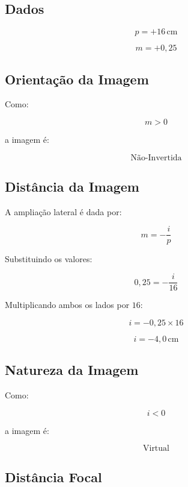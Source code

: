 \documentclass[12pt,a4paper]{article}
\begin{document}

\subsection*{Dados}

\[
p = +16\,\text{cm}
\]

\[
m = +0,25
\]


\subsection*{Orientação da Imagem}

Como:

\[
m > 0
\]

a imagem é:

\[
\boxed{\text{Não-Invertida}}
\]


\subsection*{Distância da Imagem}

A ampliação lateral é dada por:

\[
m = -\frac{i}{p}
\]

Substituindo os valores:

\[
0,25 = -\frac{i}{16}
\]

Multiplicando ambos os lados por $16$:

\[
i = -0,25 \times 16
\]

\[
i = -4,0\,\text{cm}
\]


\subsection*{Natureza da Imagem}

Como:

\[
i < 0
\]

a imagem é:

\[
\boxed{\text{Virtual}}
\]


\subsection*{Distância Focal}
\end{document}
